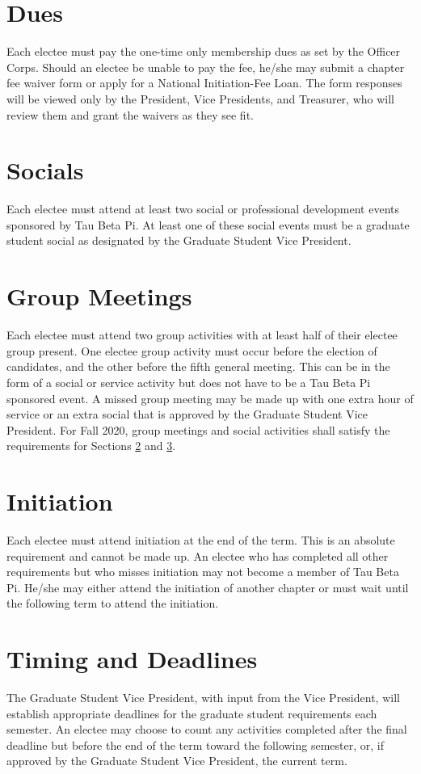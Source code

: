 \section{Dues}	Each electee must pay the one-time only membership dues as set by the Officer Corps. Should an electee be unable to pay the fee, he/she may submit a chapter fee waiver form or apply for a National Initiation-Fee Loan. The form responses will be viewed only by the President, Vice Presidents, and Treasurer, who will review them and grant the waivers as they see fit.
\section{Socials}\label{sec:grsocialreq}	Each electee must attend at least two social  or professional development events sponsored by Tau Beta Pi.  At least one of these social events must be a graduate student social as designated by the Graduate Student Vice President. %
\section{Group Meetings} \label{grad_group_meetings} Each electee must attend two group activities with at least half of their electee group present. One electee group activity must occur before the election of candidates, and the other before the fifth general meeting. This can be in the form of a social or service activity but does not have to be a Tau Beta Pi sponsored event. A missed group meeting may be made up with one extra hour of service or an extra social that is approved by the Graduate Student Vice President. For Fall 2020, group meetings and social activities shall satisfy the requirements for Sections \ref{sec:grsocialreq} and \ref{grad_group_meetings}.

\section{Initiation}	Each electee must attend initiation at the end of the term. This is an absolute requirement and cannot be made up. An electee who has completed all other requirements but who misses initiation may not become a member of Tau Beta Pi. He/she may either attend the initiation of another chapter or must wait until the following term to attend the initiation.  
\section{Timing and Deadlines}  The Graduate Student Vice President, with input from the Vice President, will establish appropriate deadlines for the graduate student requirements each semester. An electee may choose to count any activities completed after the final deadline but before the end of the term toward the following semester, or, if approved by the Graduate Student Vice President, the current term.

